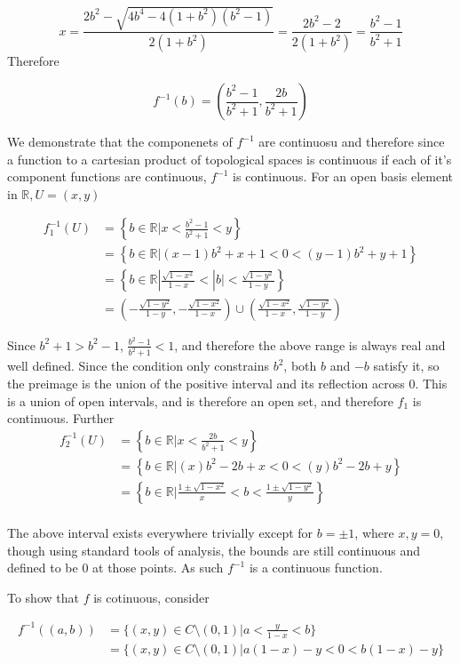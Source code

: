 \documentclass{article} %
\begin{document}
\[
  x = \frac{2b^2 - \sqrt{4b^4 - 4(1+b^2)(b^2-1)}}{2(1+b^2)} =
  \frac{2b^2 - 2}{2(1+b^2)} = \frac{b^2 -1}{b^2+1}
\]
Therefore

$$
f^{-1}(b) = \left(\frac{b^2-1}{b^2+1}, \frac{2b}{b^2+1}\right)
$$

We demonstrate that the componenets of $f^{-1}$ are continuosu and
therefore since a function to a cartesian product of topological
spaces is continuous if each of it's component functions are
continuous, $f^{-1}$ is continuous. For an open basis element in
$\mathbb{R}, U = (x,y)$

\begin{align*}
  f_1^{-1}(U) &= \left\{b \in \mathbb{R} | x < \frac{b^2-1}{b^2+1} <
  y\right\} \\
  &= \left\{b \in \mathbb{R} | (x-1)b^2+x+1< 0 <
  (y-1)b^2 + y + 1\right\} \\
  &= \left\{b \in \mathbb{R} | \frac{\sqrt{1 - x^2}}{1-x}< |b| <
  \frac{\sqrt{1 - y^2}}{1-y}\right\} \\
  &=\left(-\frac{\sqrt{1 - y^2}}{1-y},
  -\frac{\sqrt{1 - x^2}}{1-x}\right) \cup
  \left(\frac{\sqrt{1 - x^2}}{1-x},
  \frac{\sqrt{1 - y^2}}{1-y}\right)
\end{align*}

Since $b^2+1>b^2-1$, $\frac{b^2-1}{b^2+1} < 1$, and therefore the
above range is always real and well defined. Since the condition only
constrains $b^2$, both $b$ and $-b$ satisfy it, so the preimage is the
union of the positive interval and its reflection across $0$. This is
a union of open intervals, and is therefore an open set, and
therefore $f_1$ is continuous. Further
\begin{align*}
  f_2^{-1}(U) &= \left\{b \in \mathbb{R} | x < \frac{2b}{b^2+1} <
  y\right\} \\
  &= \left\{b \in \mathbb{R} | (x)b^2-2b+x< 0 <
  (y)b^2 -2b + y\right\} \\
  &= \left\{b \in \mathbb{R} | \frac{1 \pm \sqrt{1- x^2}}{x}< b <
  \frac{1 \pm \sqrt{1-y^2}}{y}\right\} \\
\end{align*}

The above interval exists everywhere trivially except for $b = \pm
1$, where $x, y = 0$, though using standard tools of analysis, the
bounds are still continuous and defined to be $0$ at those points. As
such $f^{-1}$ is a continuous function.

To show that $f$ is cotinuous, consider

\begin{align*}
  f^{-1}((a, b)) &= \{(x,y) \in C\setminus(0,1) | a < \frac{y}{1-x} < b\}\\
  &= \{(x,y) \in C \setminus (0, 1)| a(1-x)-y < 0 < b(1-x)-y\}\\
\end{align*}
\end{document}
